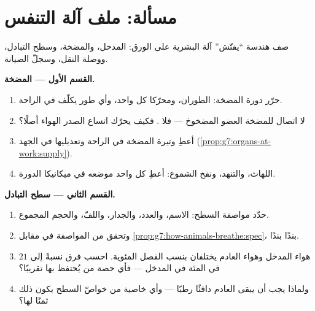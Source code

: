 \section{مسألة: ملف آلة التنفس}

\begin{problem}\label{pb:g7:lungs-and-gas-exchange:1}
صف هندسة ``يفتّش'' آلة  البشرية على الورق: المدخل، والمضخة،
وسطح التبادل، ووصلة النقل، وسجلّ الصيانة.

\medskip\noindent\textbf{القسم الأول --- المضخة.}
\begin{enumerate}
  \item حرّر دورة المضخة: الطوران، ومحرّكا كل واحد، وأي طور يكلّف
         في الراحة.
  \item لا اتصال للمضخة  العضو المضخوخ --- فلا 
        . فكيف يحرّك اتساع الصدر الهواء أصلًا؟
  \item أعطِ وتيرة المضخة في الراحة وتعديليها في الجهد
        (\cref{prop:g7:organs-at-work:supply}).
  \item اللهاث، والتنهد، ونفخ الشموع: أعطِ كل واحد موضعه في
        ميكانيكا الدورة.
\end{enumerate}

\medskip\noindent\textbf{القسم الثاني --- سطح
التبادل.}
\begin{enumerate}[resume]
  \item حدّد مواصفة السطح: الاسم، والعدد، والجدار، واللفّ،
        والحجم المجموع.
  \item وتحقق من المواصفة في مقابل
        \cref{prop:g7:how-animals-breathe:spec}، بندًا بندًا.
  \item هواء المدخل وهواء العادم يختلفان بنسب الفصل المئوية.
        احسب فرق  نسبةً إلى $21$ في المئة في المدخل ---
        فأي حصة من   يُحتفظ بها تقريبًا؟
  \item ولماذا يجب أن يبقى العادم دافئًا رطبًا --- وأي خاصية من
        خواصّ السطح يكون ذلك ثمنًا لها؟
\end{enumerate}


\end{problem}
